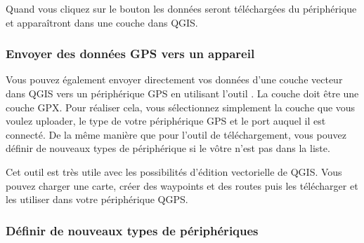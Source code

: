 Quand vous cliquez sur le bouton  les donn\'ees seront t\'el\'echarg\'ees du
p\'eriph\'erique et appara\^itront dans une couche dans QGIS.

\subsubsection{Envoyer des donn\'ees GPS vers un appareil}

Vous pouvez \'egalement envoyer directement vos donn\'ees d'une couche vecteur 
dans QGIS vers un p\'eriph\'erique GPS en utilisant l'outil .
La couche doit \^etre une couche GPX.
Pour r\'ealiser cela, vous s\'electionnez simplement la couche que vous voulez 
uploader, le type de votre p\'eriph\'erique GPS et le port auquel il est connect\'e.
De la m\^eme mani\`ere que pour l'outil de t\'el\'echargement, vous pouvez d\'efinir de 
nouveaux types de p\'eriph\'erique si le v\^otre n'est pas dans la liste.

Cet outil est tr\`es utile avec les possibilit\'es d'\'edition vectorielle de QGIS. 
Vous pouvez charger une carte, cr\'eer des waypoints et des routes puis les
t\'el\'echarger et les utiliser dans votre p\'eriph\'erique QGPS.

\subsubsection{\label{sec:Defining-new-device}D\'efinir de nouveaux types de p\'eriph\'eriques}

